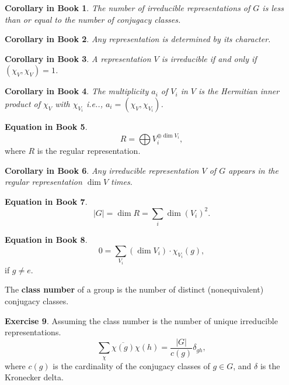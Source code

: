 \documentclass[12pt, letterpaper]{article}
\makeatletter
\newcommand\ie{i.e\@ifnextchar.{}{.\@}}
\newcommand{\card}[1]{\left\lvert #1 \right\rvert}
\newcommand{\conj}{\overline}
\theoremstyle{definition}
\theoremstyle{remark}
\theoremstyle{definition}
\newtheorem{exe}{Exercise}[section]
\newtheorem{eq}[exe]{Equation in Book}
\theoremstyle{plain}
\newtheorem{ccor}[exe]{Corollary in Book}
\numberwithin{equation}{section}
\makeatother
\begin{document}
	\begin{ccor}
		 The number of irreducible representations of $G$ is less than or 
		equal to the number of conjugacy classes.
	\end{ccor}
	\begin{ccor}
		Any representation is determined by its character.
	\end{ccor}
	\begin{ccor}\label{ccorTestIrr}
		A representation $V$ is irreducible if and only if $(\chi_V, \chi_V) = 1$.
	\end{ccor}
	\begin{ccor}
		The multiplicity $a_i$ of $V_i$ in $V$ is the Hermitian inner product of $\chi_V$ with $\chi_{V_i}$ 
		\ie, $a_i = (\chi_V, \chi_{V_i})$.
	\end{ccor}
	\begin{eq}
		\[R=\bigoplus V_i^{\oplus \dim V_i}, \]
		where $R$ is the regular representation.
	\end{eq}
	\begin{ccor}
		Any irreducible representation $V$ of $G$ appears in the regular 
		representation $\dim V$ times.
	\end{ccor}
	\begin{eq}\label{eqdimV2}
		\[\card{G}=\dim R=\sum_i\dim \left(V_i\right)^2.\]
	\end{eq}
	\begin{eq}
		\[0=\sum_{V_i}(\dim V_i)\cdot \chi_{V_i}(g),\]
		if $g\ne e$.
	\end{eq}
	\begin{def*}
		The \textbf{class number} of a group is the number of distinct (nonequivalent) conjugacy classes.
	\end{def*}
	\begin{exe}
		Assuming the class number is the number of unique irreducible representations.
		\[\sum_{\chi} \conj{\chi(g)}\chi(h) =\frac{\card{G}}{c(g)}\delta_{gh},\]
		where $c(g)$ is the cardinality of the conjugacy classes of $g \in G$,
		and $\delta$ is the Kronecker delta.
	\end{exe}
\end{document}
